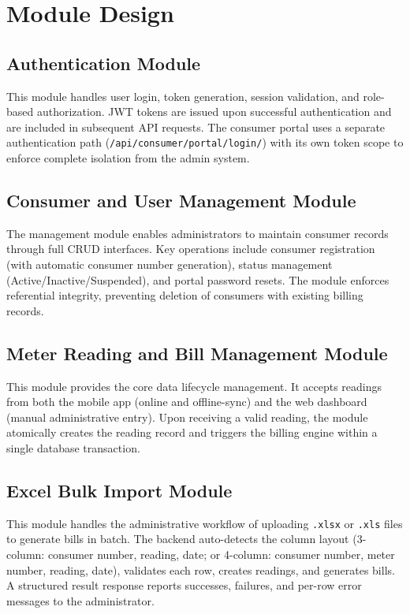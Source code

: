 \documentclass[12pt, a4paper, onecolumn]{report}
\begin{document}
\section{Module Design}

\subsection{Authentication Module}
This module handles user login, token generation, session validation, and role-based authorization. JWT tokens are issued upon successful authentication and are included in subsequent API requests. The consumer portal uses a separate authentication path (\texttt{/api/consumer/portal/login/}) with its own token scope to enforce complete isolation from the admin system.

\subsection{Consumer and User Management Module}
The management module enables administrators to maintain consumer records through full CRUD interfaces. Key operations include consumer registration (with automatic consumer number generation), status management (Active/Inactive/Suspended), and portal password resets. The module enforces referential integrity, preventing deletion of consumers with existing billing records.

\subsection{Meter Reading and Bill Management Module}
This module provides the core data lifecycle management. It accepts readings from both the mobile app (online and offline-sync) and the web dashboard (manual administrative entry). Upon receiving a valid reading, the module atomically creates the reading record and triggers the billing engine within a single database transaction.

\subsection{Excel Bulk Import Module}
This module handles the administrative workflow of uploading \texttt{.xlsx} or \texttt{.xls} files to generate bills in batch. The backend auto-detects the column layout (3-column: consumer number, reading, date; or 4-column: consumer number, meter number, reading, date), validates each row, creates readings, and generates bills. A structured result response reports successes, failures, and per-row error messages to the administrator.
\end{document}
